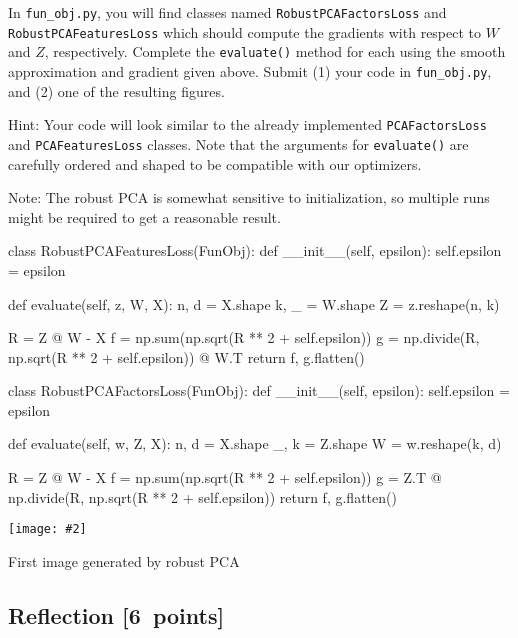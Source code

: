 \documentclass{article}
\newcommand{\blu}[1]{{\textcolor{blu}{#1}}}
\let\ask\blu
\newcommand\pts[1]{\textcolor{pointscolour}{[#1~points]}}
\newcommand{\centerfig}[2]{\begin{center}\texttt{[image: \#2]}\end{center}}
\begin{document}
In \texttt{fun\_obj.py}, you will find classes named \texttt{RobustPCAFactorsLoss} and \texttt{RobustPCAFeaturesLoss} which should compute the gradients with respect to $W$ and $Z$, respectively. \ask{Complete the \texttt{evaluate()} method for each using the smooth approximation and gradient given above. Submit (1) your code in \texttt{fun\_obj.py}, and (2) one of the resulting figures.}

Hint: Your code will look similar to the already implemented \texttt{PCAFactorsLoss} and \texttt{PCAFeaturesLoss} classes. Note that the arguments for \texttt{evaluate()} are carefully ordered and shaped to be compatible with our optimizers.

Note: The robust PCA is somewhat sensitive to initialization, so multiple runs might be required to get a reasonable result.
\vspace{1em}

\begin{python}
class RobustPCAFeaturesLoss(FunObj):
    def __init__(self, epsilon):
        self.epsilon = epsilon

    def evaluate(self, z, W, X):
        n, d = X.shape
        k, _ = W.shape
        Z = z.reshape(n, k)

        R = Z @ W - X
        f = np.sum(np.sqrt(R ** 2 + self.epsilon))
        g = np.divide(R, np.sqrt(R ** 2 + self.epsilon)) @ W.T
        return f, g.flatten()


class RobustPCAFactorsLoss(FunObj):
    def __init__(self, epsilon):
        self.epsilon = epsilon

    def evaluate(self, w, Z, X):
        n, d = X.shape
        _, k = Z.shape
        W = w.reshape(k, d)

        R = Z @ W - X
        f = np.sum(np.sqrt(R ** 2 + self.epsilon))
        g = Z.T @ np.divide(R, np.sqrt(R ** 2 + self.epsilon))
        return f, g.flatten()
\end{python}

\centerfig{.7}{./figs/robustpca_highway_000}
\begin{center}
    First image generated by robust PCA
\end{center}



\subsection{Reflection \pts{6}}
\end{document}
